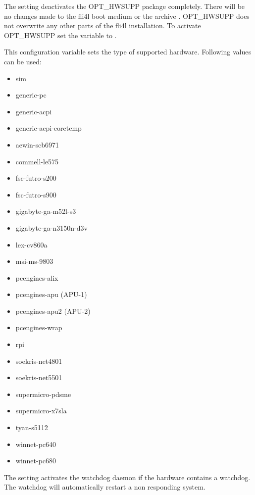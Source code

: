 \begin{description}


  The setting  deactivates the OPT\_HWSUPP package completely. There
  will be no changes made to the fli4l boot medium or the archive .
  OPT\_HWSUPP does not overwrite any other parts of the fli4l installation.
  To activate OPT\_HWSUPP set the variable  to .


  This configuration variable sets the type of supported hardware.
  Following values can be used:
  \begin{itemize}
    \item sim
    \item generic-pc
    \item generic-acpi
    \item generic-acpi-coretemp
    \item aewin-scb6971
    \item commell-le575
    \item fsc-futro-s200
    \item fsc-futro-s900
    \item gigabyte-ga-m52l-s3
    \item gigabyte-ga-n3150n-d3v
    \item lex-cv860a
    \item msi-ms-9803
    \item pcengines-alix
    \item pcengines-apu (APU-1)
    \item pcengines-apu2 (APU-2)
    \item pcengines-wrap
    \item rpi
    \item soekris-net4801
    \item soekris-net5501
    \item supermicro-pdsme
    \item supermicro-x7sla
    \item tyan-s5112
    \item winnet-pc640
    \item winnet-pc680
  \end{itemize}

  The setting  activates the watchdog daemon if the hardware
  contains a watchdog. The watchdog will automatically restart a non responding system.


\end{description}

